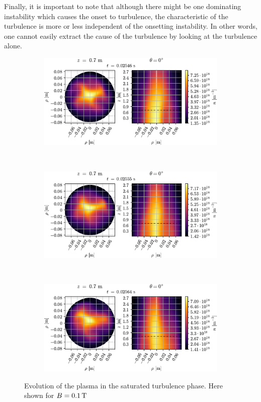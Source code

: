 Finally, it is important to note that although there might be one dominating instability which causes the onset to turbulence, the characteristic of the turbulence is more or less independent of the onsetting instability.
In other words, one cannot easily extract the cause of the turbulence by looking at the turbulence alone.
%
{
\clearpage
\thispagestyle{empty}
\begin{figure}[htbp]
    \centering
    \begin{subfigure}[h]{1.00\textwidth}
        \centering
        \includegraphics{fig/results/evolution/n-perpPar-2D-0}
    \end{subfigure}%
    \\
    \begin{subfigure}[h]{1.00\textwidth}
        \centering
        \includegraphics{fig/results/evolution/n-perpPar-2D-1}
    \end{subfigure}
    \\
    \begin{subfigure}[h]{1.00\textwidth}
        \centering
        \includegraphics{fig/results/evolution/n-perpPar-2D-2}
    \end{subfigure}
    \caption{Evolution of the plasma in the saturated turbulence phase.
        Here shown for $B=0.1\, \text{T}$}
    \label{fig:turbEv}
\end{figure}
\clearpage
}
%
